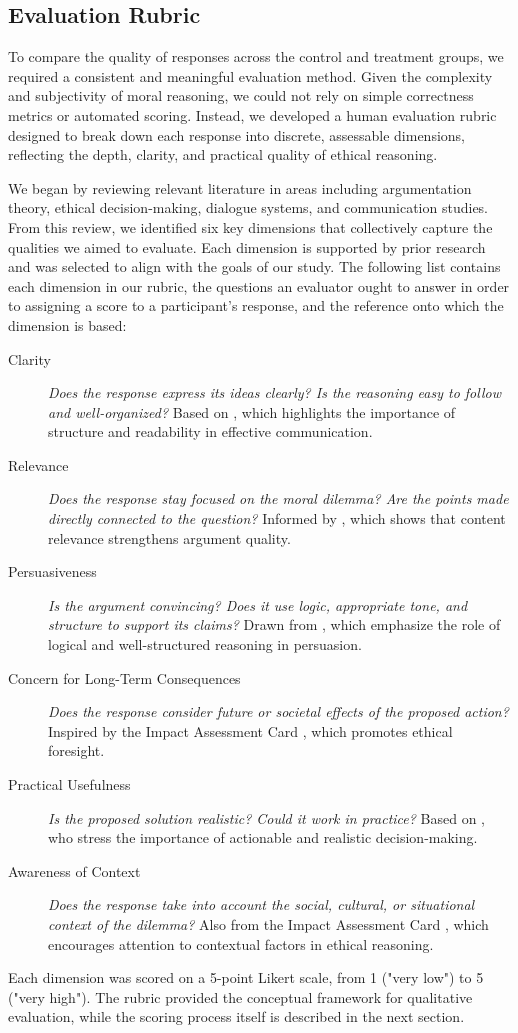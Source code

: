 \subsection{Evaluation Rubric}
\label{sec:rubric}

To compare the quality of responses across the control and treatment groups, we required a consistent and meaningful evaluation method. Given the complexity and subjectivity of moral reasoning, we could not rely on simple correctness metrics or automated scoring. Instead, we developed a human evaluation rubric designed to break down each response into discrete, assessable dimensions, reflecting the depth, clarity, and practical quality of ethical reasoning.

We began by reviewing relevant literature in areas including argumentation theory, ethical decision-making, dialogue systems, and communication studies. From this review, we identified six key dimensions that collectively capture the qualities we aimed to evaluate. Each dimension is supported by prior research and was selected to align with the goals of our study.
The following list contains each dimension in our rubric, the questions an evaluator ought to answer in order to assigning a score to a participant's response, and the reference onto which the dimension is based:

\begin{description}
  \item[Clarity] \textit{Does the response express its ideas clearly? Is the reasoning easy to follow and well-organized?}
    Based on \citep{mctear2005spoken}, which highlights the importance of structure and readability in effective communication.
  \item[Relevance] \textit{Does the response stay focused on the moral dilemma? Are the points made directly connected to the question?}
    Informed by \citet{habernal2016argument}, which shows that content relevance strengthens argument quality.
  \item[Persuasiveness] \textit{Is the argument convincing? Does it use logic, appropriate tone, and structure to support its claims?}
    Drawn from \citet{johnson2006logical}, which emphasize the role of logical and well-structured reasoning in persuasion.
  \item[Concern for Long-Term Consequences] \textit{Does the response consider future or societal effects of the proposed action?}
    Inspired by the Impact Assessment Card \citep{impactassessment2018cscw}, which promotes ethical foresight.
  \item[Practical Usefulness] \textit{Is the proposed solution realistic? Could it work in practice?}
    Based on \citet{bazerman2012judgment}, who stress the importance of actionable and realistic decision-making.
  \item[Awareness of Context] \textit{Does the response take into account the social, cultural, or situational context of the dilemma?}
    Also from the Impact Assessment Card \citep{impactassessment2018cscw}, which encourages attention to contextual factors in ethical reasoning.
\end{description}

Each dimension was scored on a 5-point Likert scale, from 1 ("very low") to 5 ("very high"). The rubric provided the conceptual framework for qualitative evaluation, while the scoring process itself is described in the next section.
